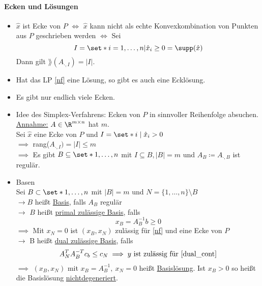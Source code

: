 \paragraph{Ecken und Lösungen}
\begin{itemize}
  \item $\hat{x}$ ist Ecke von $P$ $\iff$ $ \hat{x}$ kann nicht als echte Konvexkombination von Punkten aus $P$ geschrieben werden
		$\iff$ Sei
		\begin{equation*}
			I = \set*{i = 1 ,\dots, n | \hat{x}_{i} \geq 0 } = \supp(\hat{x})
		\end{equation*}
		Dann gilt $\rang(A_{\cdot,I})=|I|$.
	\item Hat das LP \eqref{nf} eine Lösung, so gibt es auch eine Ecklösung.
	\item Es gibt nur endlich viele Ecken.
	\item Idee des Simplex-Verfahrens: Ecken von $P$ in sinnvoller Reihenfolge absuchen.\\
		\underline{Annahme:} $A \in \R^{m \times n }$ hat  $m$. \\
		Sei $\hat{x}$ eine Ecke von $P$ und $I = \set*{i \mid \hat{x}_{i}>0}$ \\
		$\implies$ rang($A_{\cdot,I}   )= |I| \leq m$ \\
		$\implies$ Es gibt $B \subseteq \set*{1,\dots,n}$ mit $I \subseteq B, |B| = m $ und $A_{B}\coloneqq A_{\cdot,B}$ ist regulär.
	\item Basen\\
		Sei $B \subset \set*{1,\dots,n}$ mit $|B|=m$ und $N = \{1,\dots,n\}\setminus B$\\
		$\to B$ heißt \underline{Basis}, falls $A_{B}$ regulär\\
		$\to$ $B$ heißt \underline{primal zulässige Basis}, falls
		\begin{equation*}
			x_{B}=A_{B}^{-1}b \geq 0
		\end{equation*} $\implies$ Mit $x_{N} = 0$ ist $(x_{B},x_{N})$ zulässig für \eqref{nf} und eine Ecke von $P$ \\
		$\to$ B heißt \underline{dual zulässige Basis}, falls
		\begin{equation*}
			A_{N}^TA_{B}^{-T}c_{b} \leq c_{N} \implies y \text{ ist zulässig für \eqref{dual_cont}}
		\end{equation*}
		$\implies$ $\left(x_{B},x_{N} \right)$ mit $x_{B} = A^{-1}_{B},\ x_{N}= 0$ heißt \underline{Basislösung}. Ist $x_{B} > 0 $ so heißt die Basislösung \underline{nichtdegeneriert}.
\end{itemize}

